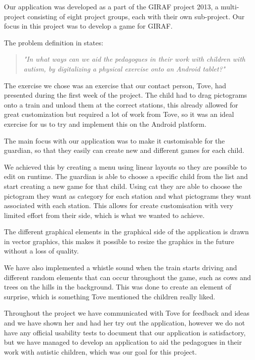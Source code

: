 Our application was developed as a part of the GIRAF project 2013, a multi-project consisting of eight project groups, each with their own sub-project. Our focus in this project was to develop a game for GIRAF. 

The problem definition in  states:

\begin{quote}
\textit{"In what ways can we aid the pedagogues in their work with children with autism, by digitalizing a physical exercise onto an Android tablet?"} 
\end{quote}

The exercise we chose was an exercise that our contact person, Tove, had presented during the first week of the project. The child had to drag pictograms onto a train and unload them at the correct stations, this already allowed for great customization but required a lot of work from Tove, so it was an ideal exercise for us to try and implement this on the Android platform. 

The main focus with our application was to make it customisable for the guardian, so that they easily can create new and different games for each child. 

We achieved this by creating a menu using linear layouts so they are possible to edit on runtime. The guardian is able to choose a specific child from the list and start creating a new game for that child. Using \ac{cat} they are able to choose the pictogram they want as category for each station and what pictograms they want associated with each station. This allows for create customisation with very limited effort from their side, which is what we wanted to achieve. 

The different graphical elements in the graphical side of the application is drawn in vector graphics, this makes it possible to resize the graphics in the future without a loss of quality. 

We have also implemented a whistle sound when the train starts driving and different random elements that can occur throughout the game, such as cows and trees on the hills in the background. This was done to create an element of surprise, which is something Tove mentioned the children really liked. 

Throughout the project we have communicated with Tove for feedback and ideas and we have shown her and had her try out the application, however we do not have any official usability tests to document that our application is satisfactory, but we have managed to develop an application to aid the pedagogues in their work with autistic children, which was our goal for this project. 